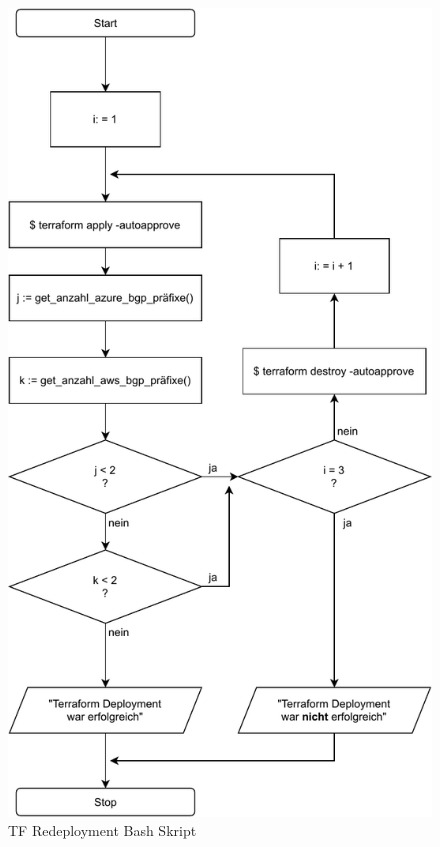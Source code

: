\begin{figure}[h]
  \centering
  \includegraphics{Figures/programmablaufplan_bash_deploy_tf.pdf}
  \caption{TF Redeployment Bash Skript}
  \label{grafik:programmablaufplan_bash_deploy_tf}
\end{figure}


